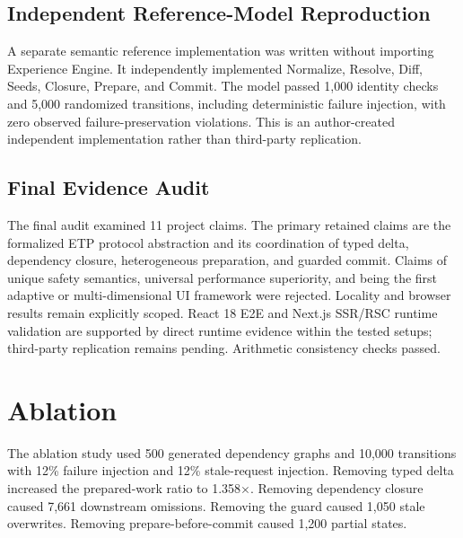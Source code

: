 \documentclass[manuscript,anonymous]{acmart}
\begin{document}
\subsection{Independent Reference-Model Reproduction}
A separate semantic reference implementation was written without importing Experience Engine.
It independently implemented Normalize, Resolve, Diff, Seeds, Closure, Prepare, and Commit.
The model passed 1,000 identity checks and 5,000 randomized transitions, including deterministic
failure injection, with zero observed failure-preservation violations. This is an
author-created independent implementation rather than third-party replication.

\subsection{Final Evidence Audit}
The final audit examined 11 project claims. The primary retained claims are the formalized
ETP protocol abstraction and its coordination of typed delta, dependency closure,
heterogeneous preparation, and guarded commit. Claims of unique safety semantics, universal
performance superiority, and being the first adaptive or multi-dimensional UI framework were
rejected. Locality and browser results remain explicitly scoped. React 18 E2E and Next.js
SSR/RSC runtime validation are supported by direct runtime evidence within the tested setups;
third-party replication remains pending. Arithmetic consistency checks passed.

\section{Ablation}
The ablation study used 500 generated dependency graphs and 10,000 transitions with 12\%
failure injection and 12\% stale-request injection. Removing typed delta increased the
prepared-work ratio to 1.358$\times$. Removing dependency closure caused 7,661 downstream
omissions. Removing the guard caused 1,050 stale overwrites. Removing prepare-before-commit
caused 1,200 partial states.
\end{document}
